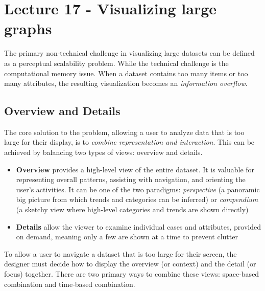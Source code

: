 \chapter{Lecture 17 - Visualizing large graphs}
The primary non-technical challenge in visualizing large datasets can be defined as a perceptual scalability problem. While the technical challenge is the computational memory issue. When a dataset contains too many items or too many attributes, the resulting visualization becomes an \textit{information overflow}.


\section{Overview and Details}
The core solution to the problem, allowing a user to analyze data that is too large for their display, is to \textit{combine representation and interaction}. This can be achieved by balancing two types of views: overview and details.
\begin{itemize}[noitemsep]
    \item \textbf{Overview} provides a high-level view of the entire dataset. It is valuable for representing overall patterns, assisting with navigation, and orienting the user's activities. It can be one of the two paradigms: \textit{perspective} (a panoramic big picture from which trends and categories can be inferred) or \textit{compendium} (a sketchy view where high-level categories and trends are shown directly)
    \item \textbf{Details} allow the viewer to examine individual cases and attributes, provided on demand, meaning only a few are shown at a time to prevent clutter
\end{itemize}

To allow a user to navigate a dataset that is too large for their screen, the designer must decide how to display the overview (or context) and the detail (or focus) together. There are two primary ways to combine these views: space-based combination and time-based combination.

